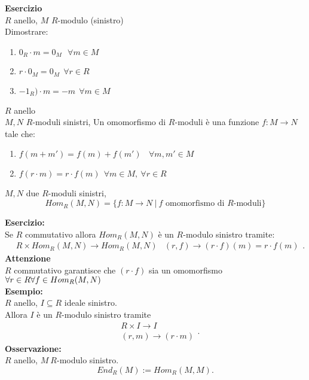 \documentclass[12px]{article}
\begin{document}
 \textbf{Esercizio}\\
 $R$ anello, $M$ $R$-modulo (sinistro)\\
 Dimostrare:
 \begin{enumerate}
	 \item $0_R\cdot m = 0_M\ \ \ \forall m\in M$
	 \item  $r\cdot 0_M = 0_M \ \ \forall r\in R$
	 \item  $-1_R)\cdot m = -m \ \ \forall m\in M$
 \end{enumerate}
 \begin{defi}
 	$R$ anello\\
	$M,N$  $R$-moduli sinistri, Un omomorfismo di $R$-moduli è una funzione  $f: M \rightarrow N$ tale che:
	\begin{enumerate}
		\item $f(m + m') = f(m) + f(m')\ \ \ \ \forall m,m'\in M$
		\item  $f(r\cdot m) = r\cdot f(m) \ \ \forall m\in M, \ \forall r\in R$
	\end{enumerate}
 \end{defi}
 \begin{defi}
 	$M,N$ due $R$-moduli sinistri,\\
\[Hom_R(M,N) = \{f: M \rightarrow N\ | \ f \text{ omomorfismo di } R\text{-moduli}\}\]
 \end{defi}
 \textbf{Esercizio:}\\
 Se $R$ commutativo allora $Hom_R (M,N)$ è un  $R$-modulo sinistro tramite:
 \[
 \begin{aligned}
	&R\times Hom_R(M,N) \rightarrow Hom_R(M,N)
	& (r,f) \rightarrow (r\cdot f)(m) = r\cdot f(m)
 \end{aligned}
 .\] 
 \textbf{Attenzione}\\
 $R$ commutativo garantisce che $(r\cdot f)$ sia un omomorfismo $\forall r\in R \\ \forall f\in Hom_R(M,N)$\\
 \textbf{Esempio:}\\
 $R$ anello, $I\subseteq R$ ideale sinistro.\\
 Allora $I$ è un $R$-modulo sinistro tramite 
 \[
 \begin{aligned}
	&R\times I \rightarrow I\\
	& (r,m) \rightarrow (r\cdot m)
 \end{aligned}
 .\] 
 \textbf{Osservazione:}\\
 $R$ anello, $M\  R$-modulo sinistro.\\
 \[
 End_R(M) := Hom_R(M,M)
 .\] 
\end{document}

